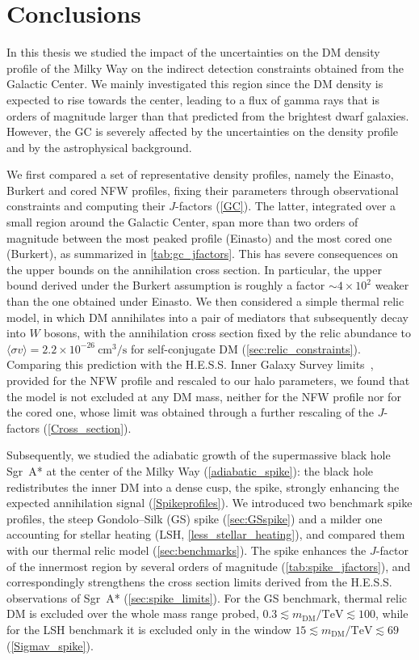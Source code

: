 \chapter*{Conclusions}


In this thesis we studied the impact of the uncertainties on the DM density profile of the Milky Way on the indirect detection constraints obtained from the Galactic Center.
We mainly investigated this region since the DM density is expected to rise towards the center, leading to a flux of gamma rays that is orders of magnitude larger than that predicted 
from the brightest dwarf galaxies. 
However, the GC is severely affected by the uncertainties on the density
profile and by the astrophysical background.

We first compared a set of representative density profiles, namely the Einasto, Burkert and cored NFW profiles, fixing their parameters through observational constraints and computing their $J$-factors (\cref{GC}).
The latter, integrated over a small region around the Galactic Center, span more than two orders of magnitude between the most peaked profile (Einasto) and the most cored one (Burkert), as summarized in \cref{tab:gc_jfactors}.
This has severe consequences on the upper bounds on the annihilation cross section. In particular, the upper bound derived under
the Burkert assumption is roughly a factor $\sim 4\times10^{2}$ weaker than the one obtained under Einasto.
We then considered a simple thermal relic model, in which DM annihilates into a pair of mediators that subsequently decay into $W$ bosons, with the annihilation cross section fixed by the relic abundance to $\langle\sigma v\rangle = 2.2\times10^{-26}~\mathrm{cm^3/s}$ for self-conjugate DM (\cref{sec:relic_constraints}).
Comparing this prediction with the H.E.S.S. Inner Galaxy Survey limits~\cite{Abdalla_2022}, provided for the NFW profile and rescaled to our halo parameters, we found that the model is not excluded at any DM mass, neither for the NFW profile nor for the cored one, whose limit was
obtained through a further rescaling of the $J$-factors (\cref{Cross_section}).

Subsequently, we studied the adiabatic growth of the supermassive black hole Sgr~A* at the center of the Milky Way (\cref{adiabatic_spike}):
the black hole redistributes the inner DM into a dense cusp, the spike, strongly enhancing the expected annihilation signal (\cref{Spikeprofiles}).
We introduced two benchmark spike profiles, the steep Gondolo--Silk (GS) spike (\cref{sec:GSspike}) and a milder one accounting for stellar heating (LSH, \cref{less_stellar_heating}), and compared them with our thermal relic model (\cref{sec:benchmarks}).
The spike enhances the $J$-factor of the innermost region by several orders of magnitude (\cref{tab:spike_jfactors}), and correspondingly strengthens the cross section limits derived from the H.E.S.S. observations of Sgr~A* (\cref{sec:spike_limits}).
For the GS benchmark, thermal relic DM is excluded over the whole mass range probed, $0.3 \lesssim m_{\mathrm{DM}}/\mathrm{TeV} \lesssim 100$, while for the LSH benchmark it is excluded only in the window $15 \lesssim m_{\mathrm{DM}}/\mathrm{TeV} \lesssim 69$ (\cref{Sigmav_spike}).


